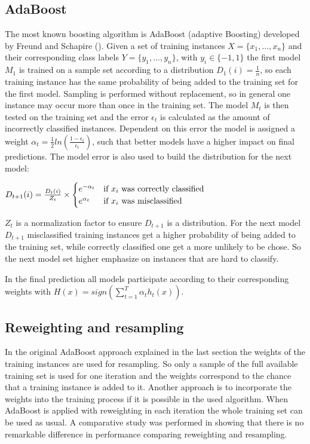 \documentclass[10pt]{reportMaster}
\begin{document}
\subsection{AdaBoost}
The most known boosting algorithm is AdaBoost (adaptive Boosting) developed by Freund and Schapire (\cite{boostingIntro}).
Given a set of training instances $X = \{x_1, ..., x_n\}$ and their corresponding class labels $Y = \{y_1, ..., y_n\}$, with $y_i \in \{-1, 1\}$ the first model $M_1$ is trained on a sample set according to a distribution $D_1(i) = \frac{1}{n}$, so each training instance has the same probability of being added to the training set for the first model.
Sampling is performed without replacement, so in general one instance may occur more than once in the training set.
The model $M_t$ is then tested on the training set and the error $\epsilon_t$ is calculated as the amount of incorrectly classified instances.
Dependent on this error the model is assigned a weight $\alpha_t = \frac{1}{2} ln(\frac{1 - \epsilon_t}{\epsilon_t})$, such that better models have a higher impact on final predictions.
The model error is also used to build the distribution for the next model: 

$ D_{t+1}(i) = \frac{D_t(i)}{Z_t} \times 
\begin{cases}
	e^{-\alpha_t} & \text{if $ x_i $ was correctly classified} \\ 
	e^{\alpha_t} & \text{if $ x_i $ was misclassified}
\end{cases}
$

$Z_t$ is a normalization factor to ensure $D_{t+1}$ is a distribution.
For the next model $D_{t+1}$ misclassified training instances get a higher probability of being added to the training set, while correctly classified one get a more unlikely to be chose.
So the next model set higher emphasize on instances that are hard to classify.

In the final prediction all models participate according to their corresponding weights with $H(x) = sign(\sum_{t = 1}^T\alpha_th_t(x))$.


\subsection{Reweighting and resampling}
In the original AdaBoost approach explained in the last section the weights of the training instances are used for resampling.
So only a sample of the full available training set is used for one iteration and the weights correspond to the chance that a training instance is added to it.
Another approach is to incorporate the weights into the training process if it is possible in the used algorithm.
When AdaBoost is applied with reweighting in each iteration the whole training set can be used as usual.
A comparative study was performed in \cite{resamplingReweighting} showing that there is no remarkable difference in performance comparing reweighting and resampling.
\end{document}
